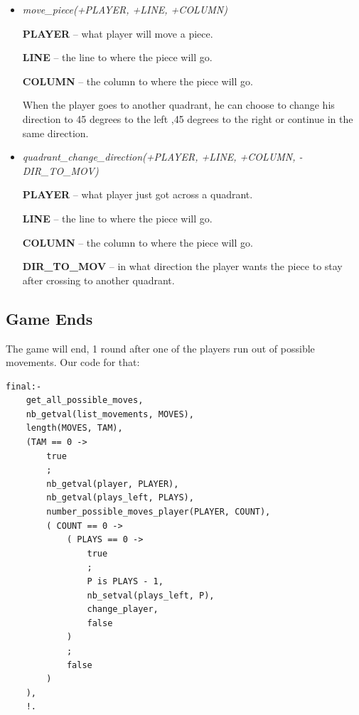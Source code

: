 \documentclass[a4paper]{article}
\begin{document}
\begin{itemize}
\item \textit{move\_piece(+PLAYER, +LINE, +COLUMN)}

\vspace{5mm}

\textbf{PLAYER} – what player will move a piece.

\textbf{LINE} – the line to where the piece will go.

\textbf{COLUMN} – the column to where the piece will go.

\vspace{5mm}

When the player goes to another quadrant, he can choose to change his direction to 45 degrees to the left ,45 degrees to the right or continue in the same direction.

\vspace{5mm}

\item \textit{quadrant\_change\_direction(+PLAYER, +LINE, +COLUMN, -DIR\_TO\_MOV)}

\vspace{5mm}

\textbf{PLAYER} – what player just got across a quadrant.

\textbf{LINE} – the line to where the piece will go.

\textbf{COLUMN} – the column to where the piece will go.

\textbf{DIR\_TO\_MOV} – in what direction the player wants the piece to stay after crossing to another quadrant.
\end{itemize}

\subsection{Game Ends}
The game will end, 1 round after one of the players run out of
possible movements. Our code for that:

\begin{verbatim}
final:-
    get_all_possible_moves,
    nb_getval(list_movements, MOVES),
    length(MOVES, TAM),
    (TAM == 0 ->
        true
        ;
        nb_getval(player, PLAYER),
        nb_getval(plays_left, PLAYS),
        number_possible_moves_player(PLAYER, COUNT),
        ( COUNT == 0 ->
            ( PLAYS == 0 ->
                true
                ;
                P is PLAYS - 1,
                nb_setval(plays_left, P),
                change_player,
                false
            )
            ;
            false
        )
    ),
    !.

\end{verbatim}
\end{document}
